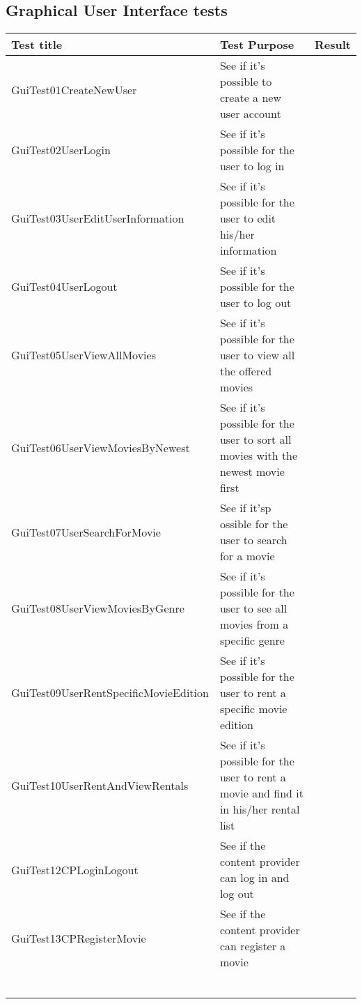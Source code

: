 \subsection{Graphical User Interface tests}
\label{Appendix_Test_Table_GUI}
\begin{centering}
\begin{longtable}{| p{5 cm} | p{7 cm} | c |}
\hline
Test title & Test Purpose & Result\\
\hline
GuiTest01CreateNewUser & See if it's possible to create a new user account & \\
\hline
GuiTest02UserLogin & See if it's possible for the user to log in & \\
\hline
GuiTest03UserEditUserInformation & See if it's possible for the user to edit his/her information & \\
\hline
GuiTest04UserLogout & See if it's possible for the user to log out & \\
\hline
GuiTest05UserViewAllMovies & See if it's possible for the user to view all the offered movies & \\
\hline
GuiTest06UserViewMoviesByNewest & See if it's possible for the user to sort all movies with the newest movie first & \\
\hline
GuiTest07UserSearchForMovie & See if it'sp ossible for the user to search for a movie & \\
\hline
GuiTest08UserViewMoviesByGenre & See if it's possible for the user to see all movies from a specific genre & \\
\hline
GuiTest09UserRentSpecificMovieEdition & See if it's possible for the user to rent a specific movie edition & \\
\hline
GuiTest10UserRentAndViewRentals & See if it's possible for the user to rent a movie and find it in his/her rental list & \\
\hline
GuiTest12CPLoginLogout & See if the content provider can log in and log out & \\
\hline
GuiTest13CPRegisterMovie & See if the content provider can register a movie & \\
\hline
 & & \\
\hline
 & & \\
\hline
 & & \\
\hline
 & & \\
\hline
 & & \\
\hline
 & & \\
\hline
\end{longtable}
\end{centering}

